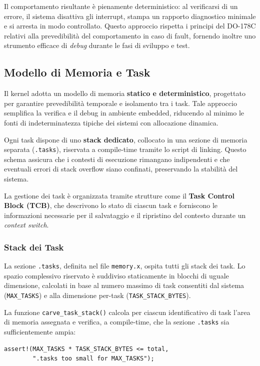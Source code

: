 \documentclass[italian, Lau, oneside]{sapthesis} %
\begin{document}
Il comportamento risultante è pienamente deterministico: al verificarsi di un errore, il sistema disattiva gli interrupt, stampa un rapporto diagnostico minimale e si arresta in modo controllato.  
Questo approccio rispetta i principi del DO-178C relativi alla prevedibilità del comportamento in caso di fault, fornendo inoltre uno strumento efficace di \emph{debug} durante le fasi di sviluppo e test.

\subsection{Modello di Memoria e Task}

Il kernel adotta un modello di memoria \textbf{statico e deterministico}, progettato per garantire prevedibilità temporale e isolamento tra i task.  
Tale approccio semplifica la verifica e il debug in ambiente embedded, riducendo al minimo le fonti di indeterminatezza tipiche dei sistemi con allocazione dinamica.

Ogni task dispone di uno \textbf{stack dedicato}, collocato in una sezione di memoria separata (\texttt{.tasks}), riservata a compile-time tramite lo script di linking.  
Questo schema assicura che i contesti di esecuzione rimangano indipendenti e che eventuali errori di stack overflow siano confinati, preservando la stabilità del sistema.  

La gestione dei task è organizzata tramite strutture come il \textbf{Task Control Block (TCB)}, che descrivono lo stato di ciascun task e forniscono le informazioni necessarie per il salvataggio e il ripristino del contesto durante un \emph{context switch}.

\subsubsection*{Stack dei Task}

La sezione \texttt{.tasks}, definita nel file \texttt{memory.x}, ospita tutti gli stack dei task.  
Lo spazio complessivo riservato è suddiviso staticamente in blocchi di uguale dimensione, calcolati in base al numero massimo di task consentiti dal sistema (\texttt{MAX\_TASKS}) e alla dimensione per-task (\texttt{TASK\_STACK\_BYTES}).  

La funzione \texttt{carve\_task\_stack()} calcola per ciascun identificativo di task l’area di memoria assegnata e verifica, a compile-time, che la sezione \texttt{.tasks} sia sufficientemente ampia:

\begin{center}
\begin{verbatim}
assert!(MAX_TASKS * TASK_STACK_BYTES <= total,
        ".tasks too small for MAX_TASKS");
\end{verbatim}
\end{center}
\end{document}
